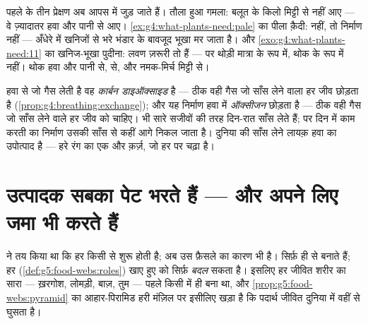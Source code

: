 \begin{example}[सबूत, एक जगह जुटे हुए]\label{ex:g6:plants-are-producers:evidence}
पहले के तीन प्रेक्षण अब आपस में जुड़ जाते हैं। तौला हुआ गमला: बलूत के
किलो मिट्टी से नहीं आए --- वे ज़्यादातर हवा और पानी से आए।
\cref{ex:g4:what-plants-need:pale} का पीला क़ैदी:  नहीं, तो
निर्माण नहीं --- अँधेरे में  खनिजों से भरे भंडार के बावजूद भूखा मर
जाता है। और \cref{exo:g4:what-plants-need:11} का खनिज-भूखा पुदीना: लवण
ज़रूरी तो हैं --- पर थोड़ी मात्रा के रूप में, थोक के रूप में नहीं। थोक
हवा और पानी से,   से, और नमक-मिर्च मिट्टी से।
\end{example}

\begin{remark}\label{rem:g6:plants-are-producers:gas}
 हवा से जो गैस लेती है वह \emph{कार्बन डाइऑक्साइड} है --- ठीक वही
गैस जो साँस लेने वाला हर जीव छोड़ता है
(\cref{prop:g4:breathing:exchange}); और यह निर्माण हवा में
\emph{ऑक्सीजन} छोड़ता है --- ठीक वही गैस जो साँस लेने वाले हर जीव को
चाहिए।  भी सारे सजीवों की तरह दिन-रात साँस लेते हैं; पर दिन में
काम करती  का निर्माण उसकी साँस से कहीं आगे निकल जाता है। दुनिया की
साँस लेने लायक़ हवा  का उपोत्पाद है --- हरे रंग का एक और क़र्ज़,
जो हर  पर चढ़ा है।
\end{remark}

\section{उत्पादक सबका पेट भरते हैं --- और अपने लिए जमा भी करते हैं}

\begin{proposition}\label{prop:g6:plants-are-producers:firstlink}
 ने तय किया था कि हर  किसी
 से शुरू होती है; अब उस फ़ैसले का कारण भी है। सिर्फ़  ही  से  बनाते हैं; हर 
(\cref{def:g5:food-webs:roles}) खाए हुए  को सिर्फ़
\emph{बदल} सकता है। इसलिए हर जीवित शरीर का सारा  ---
ख़रगोश, लोमड़ी, बाज़, तुम --- पहले किसी  में ही बना था, और
\cref{prop:g5:food-webs:pyramid} का आहार-पिरामिड हरी मंज़िल पर इसीलिए
खड़ा है कि पदार्थ जीवित दुनिया में वहीं से घुसता है।
\end{proposition}
\admitted

